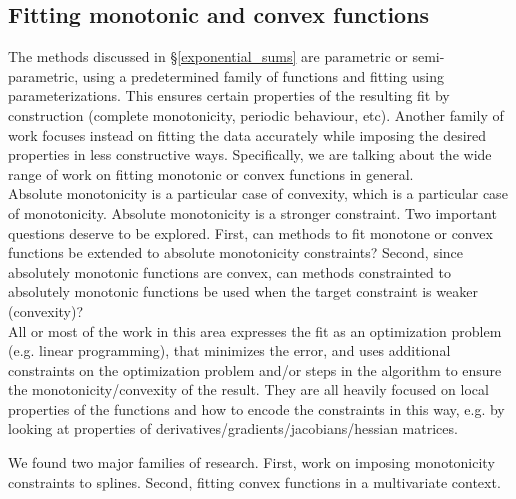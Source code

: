 \documentclass[12pt,a4paper]{article}
\begin{document}
\subsection{Fitting monotonic and convex functions}

The methods discussed in \S \ref{exponential_sums} are parametric or semi-parametric, using a predetermined family of functions and fitting using parameterizations. This ensures certain properties of the resulting fit by construction (complete monotonicity, periodic behaviour, etc). Another family of work focuses instead on fitting the data accurately while imposing the desired properties in less constructive ways. Specifically, we are talking about the wide range of work on fitting monotonic or convex functions in general.\\

Absolute monotonicity is a particular case of convexity, which is a particular case of monotonicity. Absolute monotonicity is a stronger constraint. Two important questions deserve to be explored. First, can methods to fit monotone or convex functions be extended to absolute monotonicity constraints? Second, since absolutely monotonic functions are convex, can methods constrainted to absolutely monotonic functions be used when the target constraint is weaker (convexity)?\\

All or most of the work in this area expresses the fit as an optimization problem (e.g. linear programming), that minimizes the error, and uses additional constraints on the optimization problem and/or steps in the algorithm to ensure the monotonicity/convexity of the result. They are all heavily focused on local properties of the functions and how to encode the constraints in this way, e.g. by looking at properties of derivatives/gradients/jacobians/hessian matrices.

We found two major families of research. First, work on imposing monotonicity constraints to splines. Second, fitting convex functions in a multivariate context.\\
\end{document}
